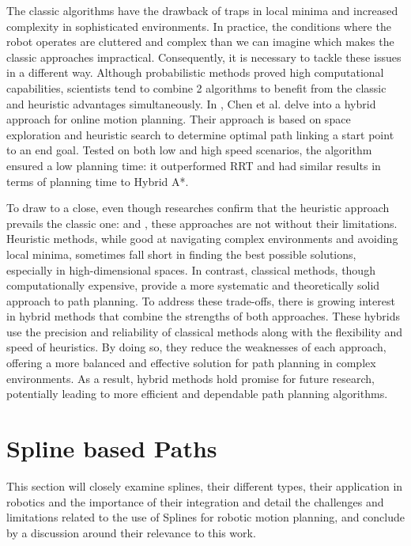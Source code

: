 The classic algorithms have the drawback of traps in local minima and increased complexity in sophisticated environments.
In practice, the conditions where the robot operates are cluttered and complex than we can imagine which makes the classic 
approaches impractical. Consequently, it is necessary to tackle these issues in a different way. Although 
probabilistic methods proved high computational capabilities, scientists tend to combine 2 algorithms to 
benefit from the classic and heuristic advantages simultaneously. In \cite{R27}, Chen et al. delve into a hybrid
approach for online motion planning. Their approach is based on space exploration and heuristic search to determine 
optimal path linking a start point to an end goal. Tested on both low and high speed scenarios, the algorithm ensured
a low planning time: it outperformed RRT and had similar results in terms of planning time to Hybrid A*. 

To draw to a close, even though researches confirm that the heuristic approach prevails the classic one:
\cite{R20} and \cite{R25}, these approaches are not without their limitations. Heuristic methods, while good at 
navigating complex environments and avoiding local minima, sometimes fall short in finding the best possible 
solutions, especially in high-dimensional spaces. In contrast, classical methods, though computationally 
expensive, provide a more systematic and theoretically solid approach to path planning. To address these trade-offs, 
there is growing interest in hybrid methods that combine the strengths of both approaches. 
These hybrids use the precision and reliability of classical methods along with the flexibility and 
speed of heuristics. By doing so, they reduce the weaknesses of each approach, offering a more 
balanced and effective solution for path planning in complex environments. As a result, hybrid 
methods hold promise for future research, potentially leading to more efficient and dependable 
path planning algorithms.

\newpage
\section{Spline based Paths}
This section will closely examine splines, their different types, their application in robotics and the 
importance of their integration and detail the challenges and limitations related to the use of Splines
for robotic motion planning, and conclude by a discussion around their relevance to this work.

